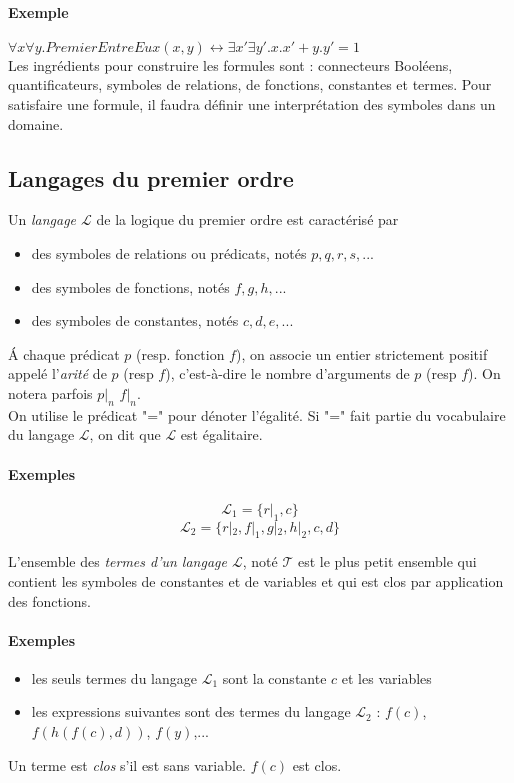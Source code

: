 \documentclass[a4paper]{article}
\begin{document}
  \paragraph{Exemple} $\forall x\forall y . PremierEntreEux(x,y) \leftrightarrow \exists x' \exists y' . x.x'+y.y' = 1$\\

  Les ingrédients pour construire les formules sont : connecteurs Booléens,
  quantificateurs, symboles de relations, de fonctions, constantes et termes. Pour
  satisfaire une formule, il faudra définir une interprétation des symboles dans un domaine.

  \subsection{Langages du premier ordre}
  Un \textit{langage $\mathcal{L}$} de la logique du premier ordre est caractérisé par
  \begin{itemize}
    \item{des symboles de relations ou prédicats, notés $p, q, r, s, ...$}
    \item{des symboles de fonctions, notés $f, g, h, ...$}
    \item{des symboles de constantes, notés $c, d, e, ...$}
  \end{itemize}
  \'A chaque prédicat $p$ (resp. fonction $f$), on associe un entier strictement
  positif appelé l'\textit{arité} de $p$ (resp $f$), c'est-à-dire le nombre
  d'arguments de $p$ (resp $f$). On notera parfois $p|_n$ $f|_n$.\\

  On utilise le prédicat "=" pour dénoter l'égalité. Si "=" fait partie du 
  vocabulaire du langage $\mathcal{L}$, on dit que $\mathcal{L}$ est égalitaire.

  \paragraph{Exemples} 
  $$\mathcal{L}_1 = \{ r|_1, c \}$$
  $$\mathcal{L}_2 = \{ r|_2, f|_1, g|_2, h|_2, c, d \}$$

  L'ensemble des \textit{termes d'un langage $\mathcal{L}$}, noté $\mathcal{T}$ est le plus petit
  ensemble qui contient les symboles de constantes et de variables et qui est
  clos par application des fonctions.

  \paragraph{Exemples}
  \begin{itemize}
    \item les seuls termes du langage $\mathcal{L}_1$ sont la constante $c$ et les variables
    \item les expressions suivantes sont des termes du langage $\mathcal{L}_2$ : $f(c)$, $f(h(f(c),d))$, $f(y)$,...
  \end{itemize}
  Un terme est \textit{clos} s'il est sans variable. $f(c)$ est clos.\\
\end{document}
